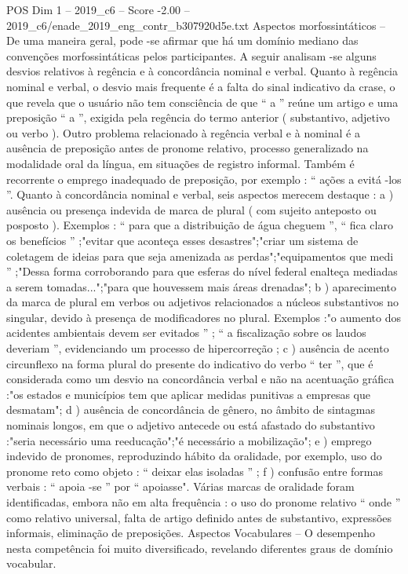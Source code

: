 \begin{textsample}{POS Dim 1 – 2019\_c6 – Score -2.00 – 2019\_c6/enade\_2019\_eng\_contr\_b307920d5e.txt}
Aspectos morfossintáticos – De uma maneira geral, pode -se afirmar que há um domínio mediano das convenções morfossintáticas pelos participantes.
A seguir analisam -se alguns desvios relativos à regência e à concordância nominal e verbal.
Quanto à regência nominal e verbal, o desvio mais frequente é a falta do sinal indicativo da crase, o que revela que o usuário não tem consciência de que “ a ” reúne um artigo e uma preposição “ a ”, exigida pela regência do termo anterior ( substantivo, adjetivo ou verbo ).
Outro problema relacionado à regência verbal e à nominal é a ausência de preposição antes de pronome relativo, processo generalizado na modalidade oral da língua, em situações de registro informal.
Também é recorrente o emprego inadequado de preposição, por exemplo : “ ações a evitá -los ”.
Quanto à concordância nominal e verbal, seis aspectos merecem destaque : a ) ausência ou presença indevida de marca de plural ( com sujeito anteposto ou posposto ).
Exemplos : “ para que a distribuição de água cheguem ”, “ fica claro os benefícios ” ;"evitar que aconteça esses desastres";"criar um sistema de coletagem de ideias para que seja amenizada as perdas";"equipamentos que medi ” ;"Dessa forma corroborando para que esferas do nível federal enalteça mediadas a serem tomadas...";"para que houvessem mais áreas drenadas"; b ) aparecimento da marca de plural em verbos ou adjetivos relacionados a núcleos substantivos no singular, devido à presença de modificadores no plural.
Exemplos :"o aumento dos acidentes ambientais devem ser evitados ” ; “ a fiscalização sobre os laudos deveriam ”, evidenciando um processo de hipercorreção ; c ) ausência de acento circunflexo na forma plural do presente do indicativo do verbo “ ter ”, que é considerada como um desvio na concordância verbal e não na acentuação gráfica :"os estados e municípios tem que aplicar medidas punitivas a empresas que desmatam"; d ) ausência de concordância de gênero, no âmbito de sintagmas nominais longos, em que o adjetivo antecede ou está afastado do substantivo :"seria necessário uma reeducação";"é necessário a mobilização"; e ) emprego indevido de pronomes, reproduzindo hábito da oralidade, por exemplo, uso do pronome reto como objeto : “ deixar elas isoladas ” ; f ) confusão entre formas verbais : “ apoia -se ” por “ apoiasse".
Várias marcas de oralidade foram identificadas, embora não em alta frequência : o uso do pronome relativo “ onde ” como relativo universal, falta de artigo definido antes de substantivo, expressões informais, eliminação de preposições.
Aspectos Vocabulares – O desempenho nesta competência foi muito diversificado, revelando diferentes graus de domínio vocabular.

\end{textsample}
